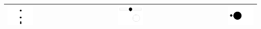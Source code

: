 \documentclass[11pt]{article}
\begin{document}
\begin{tabular}[pos]{| l | c | r |}
\\ \hline
\includegraphics[width=0.33\textwidth]{./img/input_scene3.png}
&
\includegraphics[width=0.33\textwidth]{./img/input_position3.png}
&
\includegraphics[width=0.33\textwidth]{./img/output3.png}
\\ \hline
\end{tabular}
\end{document}
